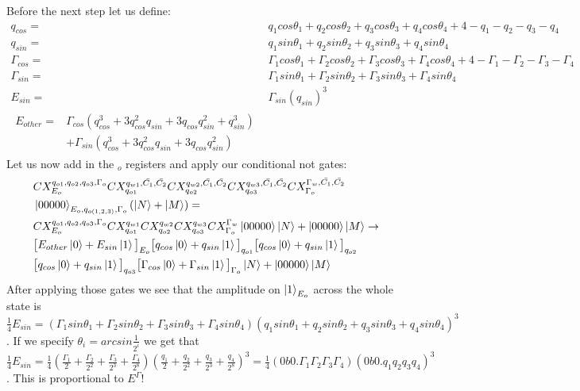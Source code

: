 \documentclass{article}
\begin{document}
Before the next step let us define:
\begin{align}
    q_{cos} =& q_1cos\theta_1+q_2cos\theta_2+q_3cos\theta_3+q_4cos\theta_4+4-q_1-q_2-q_3-q_4\\
    q_{sin} =& q_1sin\theta_1+q_2sin\theta_2+q_3sin\theta_3+q_4sin\theta_4\\
    \Gamma_{cos} =& \Gamma_1cos\theta_1+\Gamma_2cos\theta_2+\Gamma_3cos\theta_3+\Gamma_4cos\theta_4+4-\Gamma_1-\Gamma_2-\Gamma_3-\Gamma_4\\
    \Gamma_{sin} =& \Gamma_1sin\theta_1+\Gamma_2sin\theta_2+\Gamma_3sin\theta_3+\Gamma_4sin\theta_4\\
    E_{sin} =& \Gamma_{sin}(q_{sin})^3\\
    \begin{split}
        E_{other} = &\Gamma_{cos}(q_{cos}^3+3q_{cos}^2q_{sin}+3q_{cos}q_{sin}^2+q_{sin}^3)\\
        &+\Gamma_{sin}(q_{cos}^3+3q_{cos}^2q_{sin}+3q_{cos}q_{sin}^2)
    \end{split}
\end{align}
Let us now add in the $ _o$ registers and apply our conditional not gates:
\begin{equation}
    \begin{split}
        &CX_{E_o}^{q_{o1},q_{o2},q_{o3},\Gamma_o}CX_{q_{o1}}^{q_{w1},\bar{C_1},\bar{C_2}}CX_{q_{o2}}^{q_{w2},\bar{C_1},\bar{C_2}}CX_{q_{o3}}^{q_{w3},\bar{C_1},\bar{C_2}}CX_{\Gamma_o}^{\Gamma_w,\bar{C_1},\bar{C_2}}\\
        &\ket{00000}_{E_o,q_{o(1,2,3)},\Gamma_o}(\ket{N}+\ket{M})=\\
        &CX_{E_o}^{q_{o1},q_{o2},q_{o3},\Gamma_o}CX_{q_{o1}}^{q_{w1}}CX_{q_{o2}}^{q_{w2}}CX_{q_{o3}}^{q_{w3}}CX_{\Gamma_o}^{\Gamma_w}
        \ket{00000}\ket{N}+\ket{00000}\ket{M}\to\\
        &\big[E_{other}\ket{0}+E_{sin}\ket{1}\big]_{E_o}\big[q_{cos}\ket{0}+q_{sin}\ket{1}\big]_{q_{o1}}
        \big[q_{cos}\ket{0}+q_{sin}\ket{1}\big]_{q_{o2}}\\
        &\big[q_{cos}\ket{0}+q_{sin}\ket{1}\big]_{q_{o3}}\big[\Gamma_{cos}\ket{0}+\Gamma_{sin}\ket{1}\big]_{\Gamma_{o}}\ket{N}+
        \ket{00000}\ket{M}\\
    \end{split}
\end{equation}
After applying those gates we see that the amplitude on $\ket{1}_{E_o}$ across the whole state is $\frac{1}{4}E_{sin}=(\Gamma_1sin\theta_1+\Gamma_2sin\theta_2+\Gamma_3sin\theta_3+\Gamma_4sin\theta_4)(q_1sin\theta_1+q_2sin\theta_2+q_3sin\theta_3+q_4sin\theta_4)^3$.
If we specify $\theta_i=arcsin\frac{1}{2^i}$ we get that $\frac{1}{4}E_{sin}=\frac{1}{4}(\frac{\Gamma_1}{2}+\frac{\Gamma_2}{2^2}+\frac{\Gamma_3}{2^3}+\frac{\Gamma_4}{2^8})(\frac{q_1}{2}+\frac{q_2}{2^2}+\frac{q_3}{2^3}+\frac{q_4}{2^8})^3=\frac{1}{4}(0b0.\Gamma_1\Gamma_2\Gamma_3\Gamma_4)(0b0.q_1q_2q_3q_4)^3$. This is proportional to $E^\Gamma$! 
\end{document}
